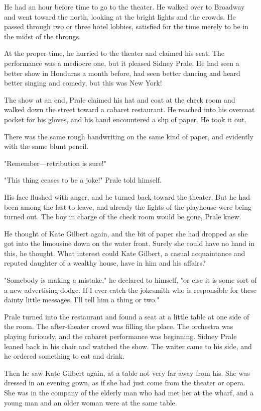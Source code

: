 \documentclass{novel}
\begin{document}
He had an hour before time to go to the theater. He walked over to Broadway and went toward the north, looking at the bright lights and the crowds. He passed through two or three hotel lobbies, satisfied for the time merely to be in the midst of the throngs.

At the proper time, he hurried to the theater and claimed his seat. The performance was a mediocre one, but it pleased Sidney Prale. He had seen a better show in Honduras a month before, had seen better dancing and heard better singing and comedy, but this was New York!

The show at an end, Prale claimed his hat and coat at the check room and walked down the street toward a cabaret restaurant. He reached into his overcoat pocket for his gloves, and his hand encountered a slip of paper. He took it out.

There was the same rough handwriting on the same kind of paper, and evidently with the same blunt pencil.

"Remember---retribution is sure!"

"This thing ceases to be a joke!" Prale told himself.

His face flushed with anger, and he turned back toward the theater. But he had been among the last to leave, and already the lights of the playhouse were being turned out. The boy in charge of the check room would be gone, Prale knew.

He thought of Kate Gilbert again, and the bit of paper she had dropped as she got into the limousine down on the water front. Surely she could have no hand in this, he thought. What interest could Kate Gilbert, a casual acquaintance and reputed daughter of a wealthy house, have in him and his affairs?

"Somebody is making a mistake," he declared to himself, "or else it is some sort of a new advertising dodge. If I ever catch the jokesmith who is responsible for these dainty little messages, I'll tell him a thing or two."

Prale turned into the restaurant and found a seat at a little table at one side of the room. The after-theater crowd was filling the place. The orchestra was playing furiously, and the cabaret performance was beginning. Sidney Prale leaned back in his chair and watched the show. The waiter came to his side, and he ordered something to eat and drink.

Then he saw Kate Gilbert again, at a table not very far away from his. She was dressed in an evening gown, as if she had just come from the theater or opera. She was in the company of the elderly man who had met her at the wharf, and a young man and an older woman were at the same table.
\end{document}
